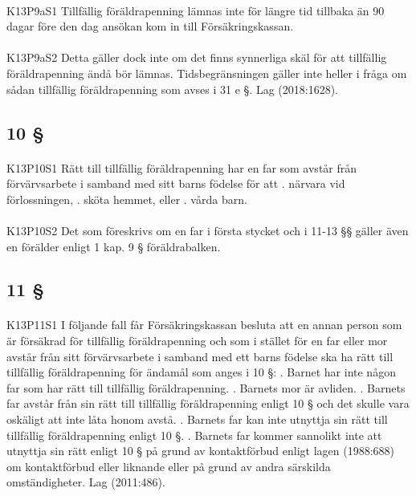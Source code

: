 \documentclass[a4paper,notitlepage,openany,10pt]{book}
\begin{document}
\paragraph*{}
{\tiny K13P9aS1}
Tillfällig föräldrapenning lämnas inte för längre tid tillbaka än 90 dagar före den dag ansökan kom in till Försäkringskassan.
\paragraph*{}
{\tiny K13P9aS2}
Detta gäller dock inte om det finns synnerliga skäl för att tillfällig föräldrapenning ändå bör lämnas. Tidsbegränsningen gäller inte heller i fråga om sådan tillfällig föräldrapenning som avses i 31 e §.
Lag (2018:1628).
\subsection*{10 §}
\paragraph*{}
{\tiny K13P10S1}
Rätt till tillfällig föräldrapenning har en far som avstår från förvärvsarbete i samband med sitt barns födelse för att
. närvara vid förlossningen,
. sköta hemmet, eller
. vårda barn.
\paragraph*{}
{\tiny K13P10S2}
Det som föreskrivs om en far i första stycket och i 11-13 §§ gäller även en förälder enligt 1 kap. 9 § föräldrabalken.
\subsection*{11 §}
\paragraph*{}
{\tiny K13P11S1}
I följande fall får Försäkringskassan besluta att en annan person som är försäkrad för tillfällig föräldrapenning och som i stället för en far eller mor avstår från sitt förvärvsarbete i samband med ett barns födelse ska ha rätt till tillfällig föräldrapenning för ändamål som anges i 10 §:
. Barnet har inte någon far som har rätt till tillfällig föräldrapenning.
. Barnets mor är avliden.
. Barnets far avstår från sin rätt till tillfällig föräldrapenning enligt 10 § och det skulle vara oskäligt att inte låta honom avstå.
. Barnets far kan inte utnyttja sin rätt till tillfällig föräldrapenning enligt 10 §.
. Barnets far kommer sannolikt inte att utnyttja sin rätt enligt 10 § på grund av kontaktförbud enligt lagen (1988:688) om kontaktförbud eller liknande eller på grund av andra särskilda omständigheter.
Lag (2011:486).
\end{document}
